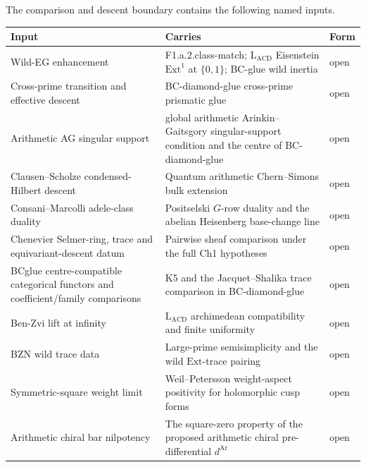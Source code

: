 \begin{definition}
\label{v4-arith:w10-final:def:prior-table}
\ClaimStatusDefinitional The comparison and descent boundary contains
the following named inputs.
\begin{center}
\small
\begin{tabular}{p{3.6cm}p{7.8cm}p{1.4cm}}
\toprule
\textbf{Input} & \textbf{Carries} & \textbf{Form}\\
\midrule
Wild-EG enhancement &
F1.a.2.class-match;
\(\mathrm{L}_{\mathrm{ACD}}\) Eisenstein \(\mathrm{Ext}^{1}\) at
\(\{0,1\}\); BC-glue wild inertia &
\(\mathrm{open}\)\\
Cross-prime transition and effective descent &
BC-diamond-glue cross-prime prismatic glue &
\(\mathrm{open}\)\\
Arithmetic AG singular support &
global arithmetic Arinkin--Gaitsgory singular-support condition and
the centre of BC-diamond-glue &
\(\mathrm{open}\)\\
Clausen--Scholze condensed-Hilbert descent &
Quantum arithmetic Chern--Simons bulk extension &
\(\mathrm{open}\)\\
Consani--Marcolli adele-class duality &
Positselski \(G\)-row duality and the abelian Heisenberg base-change
line &
\(\mathrm{open}\)\\
Chenevier Selmer-ring, trace and equivariant-descent datum &
Pairwise sheaf comparison under the full Ch1 hypotheses &
\(\mathrm{open}\)\\
BCglue centre-compatible categorical functors and coefficient/family comparisons &
K5 and the Jacquet--Shalika trace comparison in BC-diamond-glue &
\(\mathrm{open}\)\\
Ben-Zvi lift at infinity &
\(\mathrm{L}_{\mathrm{ACD}}\) archimedean compatibility and finite
uniformity &
\(\mathrm{open}\)\\
BZN wild trace data &
Large-prime semisimplicity and the wild \(\mathrm{Ext}\)-trace pairing &
\(\mathrm{open}\)\\
Symmetric-square weight limit &
Weil--Petersson weight-aspect positivity for holomorphic cusp forms &
\(\mathrm{open}\)\\
Arithmetic chiral bar nilpotency &
The square-zero property of the proposed arithmetic chiral
pre-differential \(d^{\mathrm{Ar}}\) &
\(\mathrm{open}\)\\
\bottomrule
\end{tabular}
\end{center}
\end{definition}

